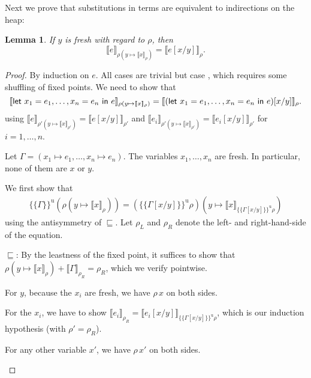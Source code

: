 \documentclass{jfp1}
\newtheorem{lemma}{Lemma}
\theoremstyle{nonumberbreak}
\newtheorem{proof}{Proof}
\newcommand{\sLet}[2]{\text{\textsf{let}}\ #1\ \text{\textsf{in}}\ #2}
\newcommand{\sRule}[1]{\text{{\textsc{#1}}}}
\newcommand{\xeng}{x_1 = e_1, \ldots, x_n = e_n}
\newcommand{\xen}{x_1\mapsto e_1, \ldots, x_n\mapsto e_n}
\newcommand{\dsem}[2]{\llbracket #1 \rrbracket_{#2}}
\newcommand{\esemu}[1]{\{\!\!\!\{#1\}\!\!\!\}^{\text{u}}}
\begin{document}
Next we prove that substitutions in terms are equivalent to indirections on the heap:

\begin{lemma}
If $y$ is fresh with regard to $\rho$, then
\label{lem:subst}
\[
\dsem{e}{\rho (y \mapsto \dsem{x}\rho)} = \dsem{ e[x/y]}{\rho}.
\]
\end{lemma}

\begin{proof}
By induction on $e$. All cases are trivial but case \sRule{Let}, which requires some shuffling of fixed points.
We need to show that
\[
\dsem{\sLet{\xeng}e}{\rho (y \mapsto \dsem{x}{\rho})} = \dsem{ (\sLet{\xeng}e)[x/y]}{\rho}.
\]
using
$\dsem{e}{\rho' (y \mapsto \dsem{x}{\rho'})} = \dsem{ e[x/y]}{\rho'}$ and
$\dsem{e_i}{\rho' (y \mapsto \dsem{x}{\rho'})} = \dsem{ e_i[x/y]}{\rho'}$ for $i=1,\ldots,n$.

Let $\Gamma = (\xen)$. The variables $x_1,\ldots,x_n$ are fresh. In particular, none of them are $x$ or $y$.

We first show that
\begin{align*}
\esemu{\Gamma}{(\rho (y \mapsto \dsem{x}{\rho}))} = (\esemu{\Gamma[x/y]}{\rho})(y \mapsto \dsem{x}{\esemu{\Gamma[x/y]}{\rho}}) \tag{$\ast$}
\end{align*}
using the antisymmetry of $\sqsubseteq$. Let $\rho_L$ and $\rho_R$ denote the left- and right-hand-side of the equation.
\begin{compactitem}[$\sqsubseteq$:]
\item[$\sqsubseteq$:]
By the leastness of the fixed point, it suffices to show that $\rho (y \mapsto \dsem{x}{\rho}) + \dsem{\Gamma}{\rho_R} = \rho_R$, which we verify pointwise.
\begin{compactitem}
\item For $y$, because the $x_i$ are fresh, we have $\rho\, x$ on both sides.
\item For the $x_i$, we have to show $\dsem{e_i}{\rho_R} = \dsem{e_i[x/y]}{\esemu{\Gamma[x/y]}{\rho}}$, which is our induction hypothesis (with $\rho' = \rho_R$).
\item For any other variable $x'$, we have $\rho\, x'$ on both sides.
\end{compactitem}


\end{compactitem}
\end{proof}
\end{document}

